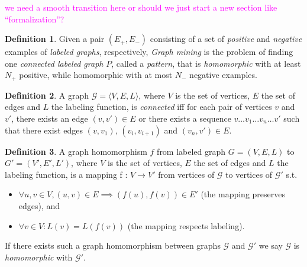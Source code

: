 \documentclass{article}
\theoremstyle{definition}
\newtheorem{definition}{Definition}[section]
\newcommand{\triple}[1]{\ensuremath{\langle #1 \rangle}}
\newcommand{\pair}[1]{\ensuremath{\left(#1\right)}}
\newcommand{\graph}[1]{\ensuremath{\mathcal{#1}}}
\newcommand{\sergey}[1]{\textcolor{magenta}{\marginpar{\sc Sergey} #1}}
\begin{document}
\sergey{we need a smooth transition here or should we just start a new section like ``formalization''?}

\begin{definition}
  \label{def:GM1}
  Given a pair $\pair{E_{+},E_{-}}$ consisting of a set of \emph{positive} and \emph{negative} examples of \emph{labeled graphs}, respectively,
  \emph{Graph mining} is the problem of finding one \emph{connected labeled graph} $P$, called a \emph{pattern},
  that is \emph{homomorphic} with at least $N_{+}$ positive, while homomorphic with at most $N_{-}$ negative examples.
\end{definition}

\begin{definition}
  A graph $\graph{G} = \triple{V,E,L}$, where $V$ is the set of vertices, $E$ the set of edges and $L$ the labeling function, is \emph{connected} iff for each pair of vertices $v$ and $v'$, there exists an edge $\pair{v,v'} \in E$ or there exists a sequence $v \ldots v_{1} \ldots v_{n} \ldots v'$ such that there exist edges $\pair{v,v_{1}}$, $\pair{v_{i},v_{i+1}}$ and $\pair{v_{n},v'} \in E$.
\end{definition}


\begin{definition}
  A graph homomorphism $f$ from labeled graph $G = (V,E,L)$ to $G' = (V',E',L')$, where $V$ is the set of vertices, $E$ the set of edges and $L$ the labeling function, is a mapping f : $V \rightarrow V'$ from vertices of $\graph{G}$ to vertices of $\graph{G'}$ s.t. 
  \begin{itemize}
    \item $\forall u,v \in V, \pair{u,v} \in E \implies \pair{f(u),f(v)} \in E'$ (the mapping preserves edges), and 
    \item $\forall v \in V : L(v) = L(f(v))$ (the mapping respects labeling).
  \end{itemize}
  If there exists such a graph homomorphism between graphs $\graph{G}$ and $\graph{G'}$ we say $\graph{G}$ is \emph{homomorphic} with $\graph{G'}$.
\end{definition}
\end{document}

